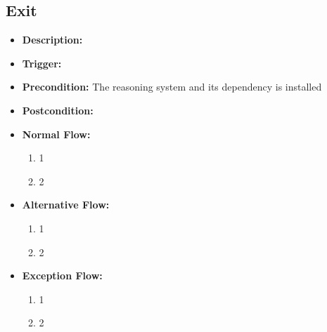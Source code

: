 \documentclass[../gr-final.tex]{subfiles}
\begin{document}
\subsection{Exit}
\begin{itemize}
  \item {\bfseries Description:} 
  \item {\bfseries Trigger:}
  \item {\bfseries Precondition:} The reasoning system and its
    dependency is installed
    
  \item {\bfseries Postcondition:}

  \item {\bfseries Normal Flow:}
    \begin{enumerate}
      \item 1
      \item 2
    \end{enumerate}
  \item {\bfseries Alternative Flow:}
    \begin{enumerate}
      \item 1
      \item 2
    \end{enumerate}
  \item {\bfseries Exception Flow:}
    \begin{enumerate}
      \item 1
      \item 2
    \end{enumerate}
\end{itemize}
\end{document}
